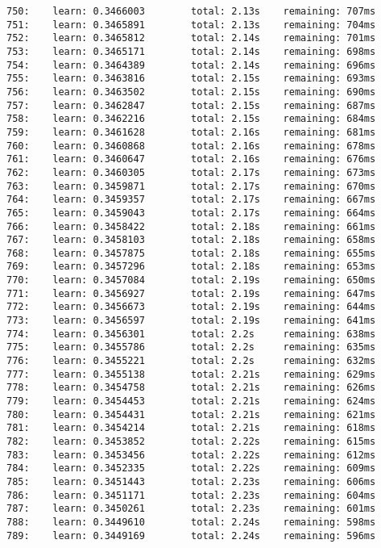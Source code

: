 \documentclass[11pt]{article}
\begin{document}
\begin{Verbatim}[commandchars=\\\{\}]
750:    learn: 0.3466003        total: 2.13s    remaining: 707ms
751:    learn: 0.3465891        total: 2.13s    remaining: 704ms
752:    learn: 0.3465812        total: 2.14s    remaining: 701ms
753:    learn: 0.3465171        total: 2.14s    remaining: 698ms
754:    learn: 0.3464389        total: 2.14s    remaining: 696ms
755:    learn: 0.3463816        total: 2.15s    remaining: 693ms
756:    learn: 0.3463502        total: 2.15s    remaining: 690ms
757:    learn: 0.3462847        total: 2.15s    remaining: 687ms
758:    learn: 0.3462216        total: 2.15s    remaining: 684ms
759:    learn: 0.3461628        total: 2.16s    remaining: 681ms
760:    learn: 0.3460868        total: 2.16s    remaining: 678ms
761:    learn: 0.3460647        total: 2.16s    remaining: 676ms
762:    learn: 0.3460305        total: 2.17s    remaining: 673ms
763:    learn: 0.3459871        total: 2.17s    remaining: 670ms
764:    learn: 0.3459357        total: 2.17s    remaining: 667ms
765:    learn: 0.3459043        total: 2.17s    remaining: 664ms
766:    learn: 0.3458422        total: 2.18s    remaining: 661ms
767:    learn: 0.3458103        total: 2.18s    remaining: 658ms
768:    learn: 0.3457875        total: 2.18s    remaining: 655ms
769:    learn: 0.3457296        total: 2.18s    remaining: 653ms
770:    learn: 0.3457084        total: 2.19s    remaining: 650ms
771:    learn: 0.3456927        total: 2.19s    remaining: 647ms
772:    learn: 0.3456673        total: 2.19s    remaining: 644ms
773:    learn: 0.3456597        total: 2.19s    remaining: 641ms
774:    learn: 0.3456301        total: 2.2s     remaining: 638ms
775:    learn: 0.3455786        total: 2.2s     remaining: 635ms
776:    learn: 0.3455221        total: 2.2s     remaining: 632ms
777:    learn: 0.3455138        total: 2.21s    remaining: 629ms
778:    learn: 0.3454758        total: 2.21s    remaining: 626ms
779:    learn: 0.3454453        total: 2.21s    remaining: 624ms
780:    learn: 0.3454431        total: 2.21s    remaining: 621ms
781:    learn: 0.3454214        total: 2.21s    remaining: 618ms
782:    learn: 0.3453852        total: 2.22s    remaining: 615ms
783:    learn: 0.3453456        total: 2.22s    remaining: 612ms
784:    learn: 0.3452335        total: 2.22s    remaining: 609ms
785:    learn: 0.3451443        total: 2.23s    remaining: 606ms
786:    learn: 0.3451171        total: 2.23s    remaining: 604ms
787:    learn: 0.3450261        total: 2.23s    remaining: 601ms
788:    learn: 0.3449610        total: 2.24s    remaining: 598ms
789:    learn: 0.3449169        total: 2.24s    remaining: 596ms

\end{Verbatim}
\end{document}
